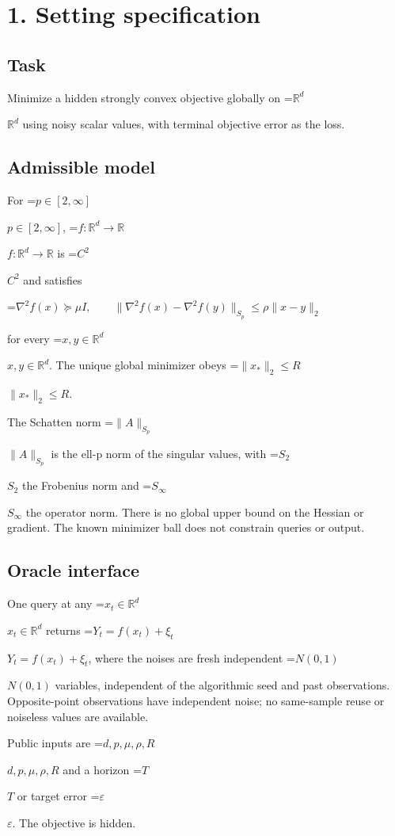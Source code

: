 \documentclass[10pt,a4paper]{article}
\newcommand{\AtlasMath}[1]{\par\begingroup\centering\setbox0=\hbox{$\displaystyle #1$}\ifdim\wd0>1.4\linewidth\typeout{ATLAS WIDE FORMULA: \the\wd0}\fi\ifdim\wd0>\linewidth\resizebox{\linewidth}{!}{\box0}\else\box0\fi\par\endgroup}
\newcommand{\AtlasInlineMath}[1]{\begingroup\setbox0=\hbox{$#1$}\ifdim\wd0>.4\linewidth\endgroup\AtlasMath{#1}\else\endgroup$#1$\fi}
\begin{document}
\section{1. Setting specification}


\subsection{Task}


Minimize a hidden strongly convex objective globally on \AtlasInlineMath{\mathbb R^d} using noisy scalar values, with terminal objective error as the loss.



\subsection{Admissible model}


For \AtlasInlineMath{p\in[2,\infty]}, \AtlasInlineMath{f:\mathbb R^d\to\mathbb R} is \AtlasInlineMath{C^2} and satisfies
\AtlasMath{\nabla^2 f(x)\succeq\mu I,\qquad\|\nabla^2f(x)-\nabla^2f(y)\|_{S_p}\le\rho\|x-y\|_2}
 for every \AtlasInlineMath{x,y\in\mathbb R^d}. The unique global minimizer obeys \AtlasInlineMath{\|x_*\|_2\le R}.



The Schatten norm \AtlasInlineMath{\|A\|_{S_p}} is the ell-p norm of the singular values, with \AtlasInlineMath{S_2} the Frobenius norm and \AtlasInlineMath{S_\infty} the operator norm. There is no global upper bound on the Hessian or gradient. The known minimizer ball does not constrain queries or output.



\subsection{Oracle interface}


One query at any \AtlasInlineMath{x_t\in\mathbb R^d} returns \AtlasInlineMath{Y_t=f(x_t)+\xi_t}, where the noises are fresh independent \AtlasInlineMath{N(0,1)} variables, independent of the algorithmic seed and past observations. Opposite-point observations have independent noise; no same-sample reuse or noiseless values are available.



Public inputs are \AtlasInlineMath{d,p,\mu,\rho,R} and a horizon \AtlasInlineMath{T} or target error \AtlasInlineMath{\varepsilon}. The objective is hidden.
\end{document}
